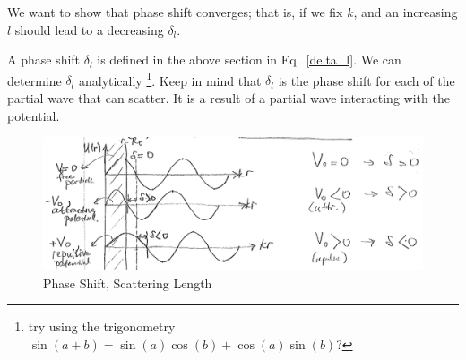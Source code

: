 \documentclass{school-22.101-notes}
\date{October 26, 2011}
\begin{document}
\maketitle


We want to show that phase shift converges; that is, if we fix $k$, and an increasing $l$ should lead to a decreasing $\delta_l$. 

A phase shift $\delta_l$ is defined in the above section in Eq.~\ref{delta_l}. We can determine $\delta_l$ analytically \footnote{try using the trigonometry $\sin(a+b) = \sin(a) \cos (b) + \cos(a) \sin(b)$?}. Keep in mind that $\delta_l$ is the phase shift for each of the partial wave that can scatter. It is a result of a partial wave interacting with the potential.  
\begin{figure}[ht]
    \centering
    \includegraphics[width=6in]{images/scattering/scattering-potential-phase-shift.png}
    \caption{Phase Shift, Scattering Length }
\end{figure}
\end{document}
